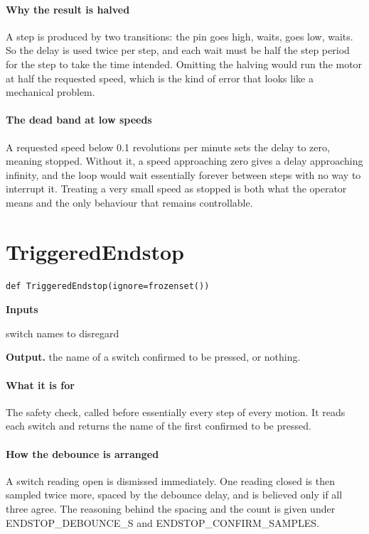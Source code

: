 \paragraph{Why the result is halved}
A step is produced by two transitions: the pin goes high, waits, goes low, waits. So the delay is used twice per step, and each wait must be half the step period for the step to take the time intended. Omitting the halving would run the motor at half the requested speed, which is the kind of error that looks like a mechanical problem.


\paragraph{The dead band at low speeds}
A requested speed below 0.1 revolutions per minute sets the delay to zero, meaning stopped. Without it, a speed approaching zero gives a delay approaching infinity, and the loop would wait essentially forever between steps with no way to interrupt it. Treating a very small speed as stopped is both what the operator means and the only behaviour that remains controllable.


\section{TriggeredEndstop}
\begin{lstlisting}[style=sig]
def TriggeredEndstop(ignore=frozenset())
\end{lstlisting}

\noindent\textbf{Inputs}
\begin{description}[leftmargin=2.2em,style=nextline,font=\normalfont\ttfamily]\setlength\itemsep{1pt}
  \item[{ignore}] \normalfont switch names to disregard
\end{description}

\noindent\textbf{Output.} the name of a switch confirmed to be pressed, or nothing.


\paragraph{What it is for}
The safety check, called before essentially every step of every motion. It reads each switch and returns the name of the first confirmed to be pressed.


\paragraph{How the debounce is arranged}
A switch reading open is dismissed immediately. One reading closed is then sampled twice more, spaced by the debounce delay, and is believed only if all three agree. The reasoning behind the spacing and the count is given under ENDSTOP\_DEBOUNCE\_S and ENDSTOP\_CONFIRM\_SAMPLES.


